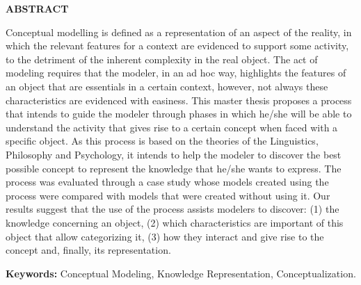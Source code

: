 \begin{center}
    \textbf{ABSTRACT}
    \vspace{60pt}
\end{center}

Conceptual modelling is defined as a representation of an aspect of the reality, in which the relevant features for a context are evidenced to support some activity, to the detriment of the inherent complexity in the real object. The act of modeling requires that the modeler, in an ad hoc way, highlights the features of an object that are essentials in a certain context, however, not always these characteristics are evidenced with easiness. This master thesis proposes a process that intends to guide the modeler through phases in which he/she will be able to understand the activity that gives rise to a certain concept when faced with a specific object. As this process is based on the theories of the Linguistics, Philosophy and Psychology, it intends to help the modeler to discover the best possible concept to represent the knowledge that he/she wants to express. The process was evaluated through a case study whose models created using the process were compared with models that were created without using it. Our results suggest that the use of the process assists modelers to discover: (1) the knowledge concerning an object, (2) which characteristics are important of this object that allow categorizing it, (3) how they interact and give rise to the concept and, finally, its representation.

\vspace{20pt}

\textbf{Keywords:} Conceptual Modeling, Knowledge Representation, Conceptualization.
